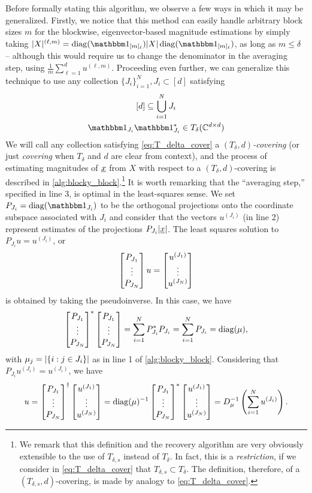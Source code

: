 Before formally stating this algorithm, we observe a few ways in which it may be generalized.  Firstly, we notice that this method can easily handle arbitrary block sizes $m$ for the blockwise, eigenvector-based magnitude estimations by simply taking $\abs{X}^{(\ell, m)} = \diag(\one_{[m]_\ell}) \abs{X} \diag(\one_{[m]_\ell})$, as long as $m \le \delta$ -- although this would require us to change the denominator in the averaging step, using $\frac{1}{m} \sum_{\ell = 1}^d u^{(\ell, m)}$.  Proceeding even further, we can generalize this technique to use any collection $\{J_i\}_{i = 1}^N, J_i \subset [d]$ satisfying \begin{equation} \begin{gathered} [d] \subset \bigcup_{i = 1}^N J_i \\ \one_{J_i} \one_{J_i}^* \in T_{\delta}(\Cdxd) \end{gathered} \label{eq:T_delta_cover}\end{equation}  We will call any collection satisfying \eqref{eq:T_delta_cover} a \emph{$(T_\delta, d)$-covering} (or just \emph{covering} when $T_\delta$ and $d$ are clear from context), and the process of estimating magnitudes of $\underline{x}$ from $X$ with respect to a $(T_\delta, d)$-covering is described in \cref{alg:blocky_block}.\footnote{We remark that this definition and the recovery algorithm are very obviously extensible to the use of $T_{\delta, s}$ instead of $T_\delta$.  In fact, this is a \emph{restriction}, if we consider in \eqref{eq:T_delta_cover} that $T_{\delta, s} \subset T_\delta$.  The definition, therefore, of a $(T_{\delta, s}, d)$-covering, is made by analogy to \eqref{eq:T_delta_cover}.}  It is worth remarking that the ``averaging step,'' specified in line 3, is optimal in the least-squares sense.  We set $P_{J_i} = \diag(\one_{J_i})$ to be the orthogonal projections onto the coordinate subspace associated with $J_i$ and consider that the vectors $u^{(J_i)}$ (in line 2) represent estimates of the projections $P_{J_i} \lvert\underline{x}\rvert$.  The least squares solution to $P_{J_i} u = u^{(J_i)}$, or \[\begin{bmatrix} P_{J_1} \\ \vdots \\ P_{J_N} \end{bmatrix} u = \begin{bmatrix} u^{(J_1)} \\ \vdots \\ u^{(J_N)} \end{bmatrix}\] is obtained by taking the pseudoinverse.  In this case, we have \[\begin{bmatrix} P_{J_1} \\ \vdots \\ P_{J_N} \end{bmatrix}^* \begin{bmatrix} P_{J_1} \\ \vdots \\ P_{J_N} \end{bmatrix} = \sum_{i = 1}^N P_{J_i}^* P_{J_i} = \sum_{i = 1}^N P_{J_i} = \operatorname{diag}(\mu),\] with $\mu_j = \lvert\{i : j \in J_i\}\rvert$ as in line 1 of \cref{alg:blocky_block}.  Considering that $P_{J_i} u^{(J_i)} = u^{(J_i)}$, we have \[u = \begin{bmatrix} P_{J_1} \\ \vdots \\ P_{J_N} \end{bmatrix}^{\dag} \begin{bmatrix} u^{(J_1)} \\ \vdots \\ u^{(J_N)} \end{bmatrix} =  \operatorname{diag}(\mu)^{-1} \begin{bmatrix} P_{J_1} \\ \vdots \\ P_{J_N} \end{bmatrix}^* \begin{bmatrix} u^{(J_1)} \\ \vdots \\ u^{(J_N)} \end{bmatrix} = D_\mu^{-1}\left(\sum_{i = 1}^N u^{(J_i)}\right).\]

